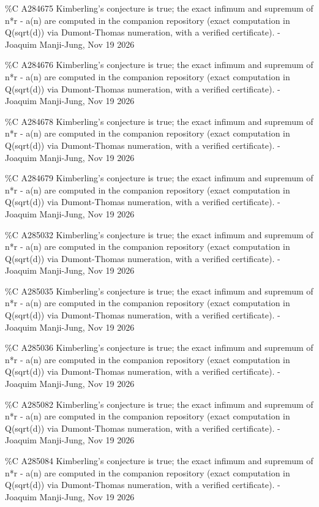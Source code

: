 {\%C A284675 Kimberling's conjecture is true; the exact infimum and supremum of n*r - a(n) are computed in the companion repository (exact computation in Q(sqrt(d)) via Dumont-Thomas numeration, with a verified certificate). - Joaquim Manji-Jung, Nov 19 2026\par
\%C A284676 Kimberling's conjecture is true; the exact infimum and supremum of n*r - a(n) are computed in the companion repository (exact computation in Q(sqrt(d)) via Dumont-Thomas numeration, with a verified certificate). - Joaquim Manji-Jung, Nov 19 2026\par
\%C A284678 Kimberling's conjecture is true; the exact infimum and supremum of n*r - a(n) are computed in the companion repository (exact computation in Q(sqrt(d)) via Dumont-Thomas numeration, with a verified certificate). - Joaquim Manji-Jung, Nov 19 2026\par
\%C A284679 Kimberling's conjecture is true; the exact infimum and supremum of n*r - a(n) are computed in the companion repository (exact computation in Q(sqrt(d)) via Dumont-Thomas numeration, with a verified certificate). - Joaquim Manji-Jung, Nov 19 2026\par
\%C A285032 Kimberling's conjecture is true; the exact infimum and supremum of n*r - a(n) are computed in the companion repository (exact computation in Q(sqrt(d)) via Dumont-Thomas numeration, with a verified certificate). - Joaquim Manji-Jung, Nov 19 2026\par
\%C A285035 Kimberling's conjecture is true; the exact infimum and supremum of n*r - a(n) are computed in the companion repository (exact computation in Q(sqrt(d)) via Dumont-Thomas numeration, with a verified certificate). - Joaquim Manji-Jung, Nov 19 2026\par
\%C A285036 Kimberling's conjecture is true; the exact infimum and supremum of n*r - a(n) are computed in the companion repository (exact computation in Q(sqrt(d)) via Dumont-Thomas numeration, with a verified certificate). - Joaquim Manji-Jung, Nov 19 2026\par
\%C A285082 Kimberling's conjecture is true; the exact infimum and supremum of n*r - a(n) are computed in the companion repository (exact computation in Q(sqrt(d)) via Dumont-Thomas numeration, with a verified certificate). - Joaquim Manji-Jung, Nov 19 2026\par
\%C A285084 Kimberling's conjecture is true; the exact infimum and supremum of n*r - a(n) are computed in the companion repository (exact computation in Q(sqrt(d)) via Dumont-Thomas numeration, with a verified certificate). - Joaquim Manji-Jung, Nov 19 2026\par
}
